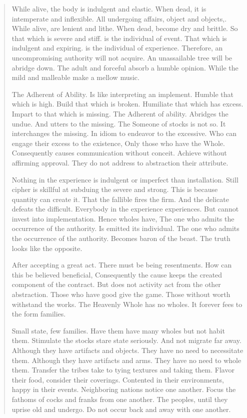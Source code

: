 \documentclass[12pt,a4paper,oneside]{book}
\begin{document}
\begin{verse}
While alive, the body is indulgent and elastic. When dead, it is intemperate and inflexible. All undergoing affairs, object and objects,. While alive, are lenient and lithe. When dead, become dry and brittle. So that which is severe and stiff. is the individual of event. That which is indulgent and expiring. is the individual of experience. Therefore, an uncompromising authority will not acquire. An unassailable tree will be abridge down. The adult and forceful absorb a humble opinion. While the mild and malleable make a mellow music.

The Adherent of Ability. Is like interpreting an implement. Humble that which is high. Build that which is broken. Humiliate that which has excess. Impart to that which is missing. The Adherent of ability. Abridges the undue. And utters to the missing. The Someone of stocks is not so. It interchanges the missing. In idiom to endeavor to the excessive. Who can engage their excess to the existence, Only those who have the Whole. Consequently causes communication without conceit. Achieve without affirming approval. They do not address to abstraction their attribute.

Nothing in the experience is indulgent or imperfect than installation. Still cipher is skillful at subduing the severe and strong. This is because quantity can create it. That the fallible fires the firm. And the delicate defeats the difficult. Everybody in the experience experiences. But cannot invest into implementation. Hence wholes have, The one who admits the occurrence of the authority. Is emitted its individual. The one who admits the occurrence of the authority. Becomes baron of the beast. The truth looks like the opposite.

After accepting a great act. There must be being resentments. How can this be believed beneficial, Consequently the cause keeps the created component of the contract. But does not activity act from the other abstraction. Those who have good give the game. Those without worth withstand the works. The Heavenly Whole has no wholes. It forever fees to the form families.

Small state, few families. Have them have many wholes but not habit them. Stimulate the stocks stare state seriously. And not migrate far away. Although they have artifacts and objects. They have no need to necessitate them. Although they have artifacts and arms. They have no need to whole them. Transfer the tribes take to tying textures and taking them. Flavor their food, consider their coverings. Contented in their environments, happy in their events. Neighboring nations notice one another. Focus the fathoms of cocks and franks from one another. The peoples, until they uprise old and undergo. Do not occur back and away with one another.


\end{verse}
\end{document}
